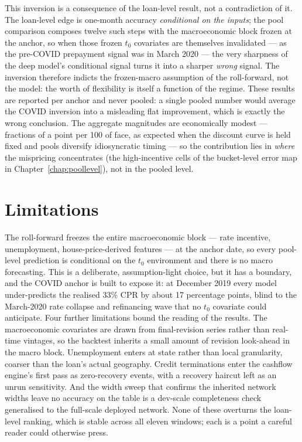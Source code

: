 This inversion is a consequence of the loan-level result, not a
contradiction of it. The loan-level edge is one-month accuracy
\emph{conditional on the inputs}; the pool comparison composes twelve
such steps with the macroeconomic block frozen at the anchor, so when
those frozen $t_0$ covariates are themselves invalidated --- as the
pre-COVID prepayment signal was in March 2020 --- the very sharpness of
the deep model's conditional signal turns it into a sharper \emph{wrong}
signal. The inversion therefore indicts the frozen-macro assumption of
the roll-forward, not the model: the worth of flexibility is itself a
function of the regime. These results are reported per anchor and never pooled: a
single pooled number would average the COVID inversion into a
misleading flat improvement, which is exactly the wrong conclusion. The
aggregate magnitudes are economically modest --- fractions of a point
per 100 of face, as expected when the discount curve is held fixed and
pools diversify idiosyncratic timing --- so the contribution lies in
\emph{where} the mispricing concentrates (the high-incentive cells of
the bucket-level error map in Chapter~\ref{chap:poollevel}), not in the
pooled level.

\section{Limitations}
\label{sec:concl-limits}

The roll-forward freezes the entire macroeconomic block --- rate
incentive, unemployment, house-price-derived features --- at the anchor
date, so every pool-level prediction is conditional on the $t_0$
environment and there is no macro forecasting. This is a deliberate,
assumption-light choice, but it has a boundary, and the COVID anchor is
built to expose it: at December 2019 every model under-predicts the
realised $33\%$ CPR by about 17 percentage points, blind to the
March-2020 rate collapse and refinancing wave that no $t_0$ covariate
could anticipate. Four further limitations bound the reading of the
results. The macroeconomic covariates are drawn from final-revision
series rather than real-time vintages, so the backtest inherits a small
amount of revision look-ahead in the macro block. Unemployment enters
at state rather than local granularity, coarser than the loan's actual
geography. Credit terminations enter the cashflow engine's first pass
as zero-recovery events, with a recovery haircut left as an unrun
sensitivity. And the width sweep that confirms the inherited network
widths leave no accuracy on the table is a dev-scale completeness check
generalised to the full-scale deployed network. None of these
overturns the loan-level ranking, which is stable across all eleven
windows; each is a point a careful reader could otherwise press.

